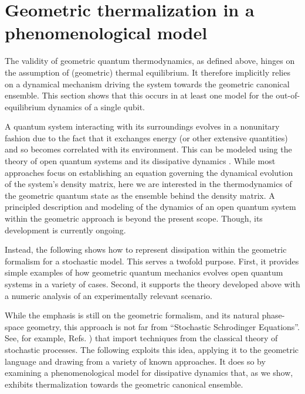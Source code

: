 \documentclass[draft,nofootinbib,pre,twocolumn,showpacs,showkeys,groupaddress,preprintnumbers,floatfix]{revtex4-1}
\newcommand{\1}{\mathbbm{1}}
\begin{document}
\section{Geometric thermalization in a phenomenological model}\label{sec:QubitsExample}

The validity of geometric quantum thermodynamics, as defined above, hinges on
the assumption of (geometric) thermal equilibrium. It therefore implicitly
relies on a dynamical mechanism driving the system towards the geometric
canonical ensemble. This section shows that this occurs in at least one model
for the out-of-equilibrium dynamics of a single qubit. 

A quantum system interacting with its surroundings evolves in a nonunitary
fashion due to the fact that it exchanges energy (or other extensive
quantities) and so becomes correlated with its environment. This can be
modeled using the theory of open quantum systems and its dissipative dynamics
\cite{Bre02,Weiss12,Gar10,Carm93}. While most approaches focus on establishing
an equation governing the dynamical evolution of the system's density matrix,
here we are interested in the thermodynamics of the geometric quantum state as
the ensemble behind the density matrix. A principled description and modeling
of the dynamics of an open quantum system within the geometric approach is
beyond the present scope. Though, its development is currently ongoing.

Instead, the following shows how to represent dissipation within the geometric
formalism for a stochastic model. This serves a twofold purpose. First, it
provides simple examples of how geometric quantum mechanics evolves open
quantum systems in a variety of cases. Second, it supports the theory
developed above with a numeric analysis of an experimentally relevant
scenario.

While the emphasis is still on the geometric formalism, and its natural
phase-space geometry, this approach is not far from ``Stochastic Schrodinger
Equations''. See, for example, Refs. \cite{Bou04,Bre02,Bel89b,Bel89a,Bel88})
that import techniques from the classical theory of stochastic processes. The
following exploits this idea, applying it to the geometric language and
drawing from a variety of known approaches. It does so by examining a
phenomenological model for dissipative dynamics that, as we show, exhibits
thermalization towards the geometric canonical ensemble. 
\end{document}
